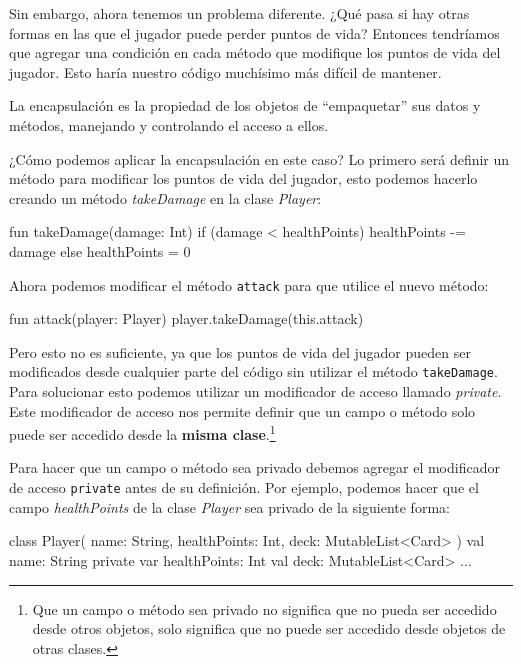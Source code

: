     Sin embargo, ahora tenemos un problema diferente.
    ¿Qué pasa si hay otras formas en las que el jugador puede perder puntos de vida?
    Entonces tendríamos que agregar una condición en cada método que modifique los puntos de vida
    del jugador.
    Esto haría nuestro código muchísimo más difícil de mantener.
    
    La encapsulación es la propiedad de los objetos de \enquote{empaquetar} sus datos y métodos, manejando
    y controlando el acceso a ellos.

    ¿Cómo podemos aplicar la encapsulación en este caso?
    Lo primero será definir un método para modificar los puntos de vida del jugador, esto podemos
    hacerlo creando un método \textit{takeDamage} en la clase \textit{Player}:

    \begin{kotlin}
      fun takeDamage(damage: Int) {
        if (damage < healthPoints) {
          healthPoints -= damage
        } else {
          healthPoints = 0
        }
      }
    \end{kotlin}

    Ahora podemos modificar el método \texttt{attack} para que utilice el nuevo método:

    \begin{kotlin}
      fun attack(player: Player) {
        player.takeDamage(this.attack)
      }
    \end{kotlin}

    Pero esto no es suficiente, ya que los puntos de vida del jugador pueden ser modificados desde
    cualquier parte del código sin utilizar el método \texttt{takeDamage}.
    Para solucionar esto podemos utilizar un modificador de acceso llamado \textit{private}.
    Este modificador de acceso nos permite definir que un campo o método solo puede ser accedido
    desde la \textbf{misma clase}.\footnote{Que un campo o método sea privado no significa que no
    pueda ser accedido desde otros objetos, solo significa que no puede ser accedido desde objetos 
    de otras clases.}
    
    Para hacer que un campo o método sea privado debemos agregar el modificador de acceso
    \texttt{private} antes de su definición.
    Por ejemplo, podemos hacer que el campo \textit{healthPoints} de la clase \textit{Player} sea
    privado de la siguiente forma:

    \begin{kotlin}
      class Player(
        name: String,
        healthPoints: Int,
        deck: MutableList<Card>
      ) {
        val name: String
        private var healthPoints: Int
        val deck: MutableList<Card>
        ...
      }
    \end{kotlin}

